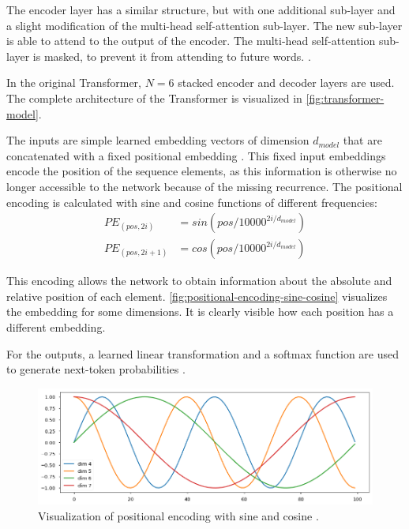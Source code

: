 The encoder layer has a similar structure, but with one additional sub-layer and a slight modification of the multi-head self-attention sub-layer.
The new sub-layer is able to attend to the output of the encoder.
The multi-head self-attention sub-layer is masked, to prevent it from attending to future words. \cite[p.~3]{1706.03762}.

In the original Transformer, $N = 6$ stacked encoder and decoder layers are used.
The complete architecture of the Transformer is visualized in \autoref{fig:transformer-model}.

The inputs are simple learned embedding vectors of dimension $d_{model}$ that are concatenated with a fixed positional embedding \cite[p.~5--6]{1706.03762}.
This fixed input embeddings encode the position of the sequence elements, as this information is otherwise no longer accessible to the network because of the missing recurrence.
The positional encoding is calculated with sine and cosine functions of different frequencies:
\begin{align*} 
	PE_{(pos,2i)} & = sin(pos/10000^{2i/d_{model}}) \\
	PE_{(pos,2i+1)} & = cos(pos/10000^{2i/d_{model}})
\end{align*}

This encoding allows the network to obtain information about the absolute and relative position of each element.
\autoref{fig:positional-encoding-sine-cosine} visualizes the embedding for some dimensions.
It is clearly visible how each position has a different embedding.

For the outputs, a learned linear transformation and a softmax function are used to generate next-token probabilities \cite[p.~5]{1706.03762}.

\begin{figure}[h]
\centering
\includegraphics[width=0.7\paperwidth]{figures/positional-encoding-sine-cosine}
\caption[Visualization of positional encoding with sine and cosine]{Visualization of positional encoding with sine and cosine \cite{annotated.transformer}.}
\label{fig:positional-encoding-sine-cosine}
\end{figure}

